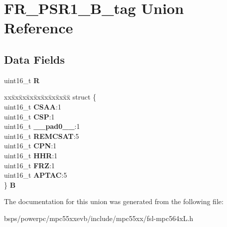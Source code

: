 \hypertarget{unionFR__PSR1__16B__tag}{}\section{F\+R\+\_\+\+P\+S\+R1\+\_\+B\+\_\+tag Union Reference}
\label{unionFR__PSR1__16B__tag}
\subsection*{Data Fields}
\begin{DoxyCompactItemize}
\item 
\mbox{\label{unionFR__PSR1__16B__tag_aaf186c1285e6e62c5b850bd8a2d3d475}} 
uint16\+\_\+t {\bfseries R}
\item 
\mbox{\label{unionFR__PSR1__16B__tag_a8a5fb5390e4a81375c55c740e63d5ce3}} 
\begin{tabbing}
xx\=xx\=xx\=xx\=xx\=xx\=xx\=xx\=xx\=\kill
struct \{\\
\>uint16\_t {\bfseries CSAA}:1\\
\>uint16\_t {\bfseries CSP}:1\\
\>uint16\_t {\bfseries \_\_pad0\_\_}:1\\
\>uint16\_t {\bfseries REMCSAT}:5\\
\>uint16\_t {\bfseries CPN}:1\\
\>uint16\_t {\bfseries HHR}:1\\
\>uint16\_t {\bfseries FRZ}:1\\
\>uint16\_t {\bfseries APTAC}:5\\
\} {\bfseries B}\\

\end{tabbing}\end{DoxyCompactItemize}


The documentation for this union was generated from the following file\+:\begin{DoxyCompactItemize}
\item 
bsps/powerpc/mpc55xxevb/include/mpc55xx/fsl-\/mpc564x\+L.\+h\end{DoxyCompactItemize}
